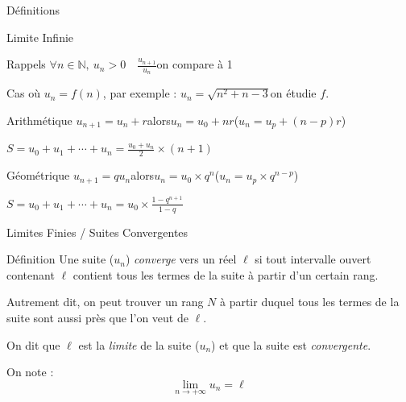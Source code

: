\documentclass{coursbook}
\begin{document}
\begin{Gpartie}{Définitions}
\begin{Spartie}{Limite Infinie}
\begin{SSpartie}{Rappels}
                $\forall n\in\mathbb{N},\ u_n>0\quad\frac{u_{n+1}}{u_n}$\quad on compare à 1

                Cas où $u_n=f(n)$, par exemple : $u_n=\sqrt{n^2+n-3}$\quad on étudie $f$.
                \begin{SSSpartie}{Arithmétique} 
                    $u_{n+1}=u_n+r$\quad alors\quad $u_n=u_0+nr$\quad\big($u_n=u_p+(n-p)r$\big)

                    $S=u_0+u_1+\dotsb+u_n=\frac{u_0+u_n}{2}\times(n+1)$
                \end{SSSpartie}
                \begin{SSSpartie}{Géométrique} 
                    $u_{n+1}=qu_n$\quad alors\quad $u_n=u_0\times q^n$\quad\big($u_n=u_p\times q^{n-p}$\big)

                    $S=u_0+u_1+\dotsb+u_n=u_0\times\frac{1-q^{n+1}}{1-q}$
                \end{SSSpartie}
            \end{SSpartie}
        \end{Spartie}
        \begin{Spartie}{Limites Finies / Suites Convergentes} 
            \begin{SSpartie}{Définition} 
                Une suite ($u_n$) \emph{converge} vers un réel $\ell$ si tout intervalle ouvert contenant $\ell$ contient tous les termes de la suite à partir d'un certain rang.

                Autrement dit, on peut trouver un rang $N$ à partir duquel tous les termes de la suite sont aussi près que l'on veut de $\ell$.

                On dit que $\ell$ est la \emph{limite} de la suite ($u_n$) et que la suite est \emph{convergente}.

                On note : \[\boxed{\lim\limits_{n\to +\infty} u_n=\ell}\]


\end{SSpartie}
\end{Spartie}
\end{Gpartie}
\end{document}
